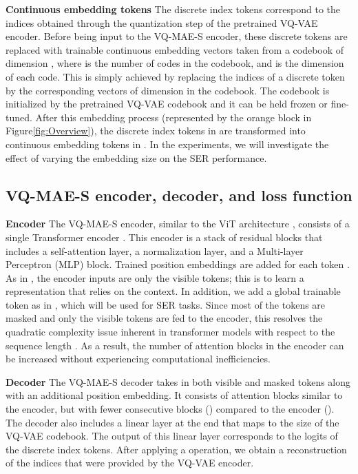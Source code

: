 \documentclass{article}
\newcommand{\myparagraph}[1]{\noindent\textbf{#1}\hspace{.25cm}}
\begin{document}
\myparagraph{Continuous embedding tokens} The discrete index tokens correspond to the indices obtained through the quantization step of the pretrained VQ-VAE encoder. Before being input to the VQ-MAE-S encoder, these discrete tokens are replaced with trainable continuous embedding vectors taken from a codebook of dimension , where  is the number of codes in the codebook, and  is the dimension of each code. This is simply achieved by replacing the  indices of a discrete token by the corresponding  vectors of dimension  in the codebook. The codebook is initialized by the pretrained VQ-VAE codebook and it can be held frozen or fine-tuned. After this embedding process (represented by the orange block in Figure\ref{fig:Overview}), the discrete index tokens in  are transformed into continuous embedding tokens in . In the experiments, we will investigate the effect of varying the embedding size  on the SER performance.

\subsection{VQ-MAE-S encoder, decoder, and loss function}



\myparagraph{Encoder} The VQ-MAE-S encoder, similar to the ViT architecture \cite{dosovitskiy2020image}, consists of a single Transformer encoder \cite{vaswani2017attention}. This encoder is a stack of  residual blocks that includes a self-attention layer, a normalization layer, and a Multi-layer Perceptron (MLP) block. Trained position embeddings are added for each token \cite{devlin2018bert}. As in \cite{he2022masked}, the encoder inputs are only the visible tokens; this is to learn a representation that relies on the context. In addition, we add a global trainable token  as in \cite{devlin2018bert}, which will be used for SER tasks. 
Since most of the tokens are masked and only the visible tokens are fed to the encoder, this resolves the quadratic complexity issue inherent in transformer models with respect to the sequence length \cite{he2022masked}. As a result, the number of attention blocks in the encoder can be increased without experiencing computational inefficiencies.

\myparagraph{Decoder} The VQ-MAE-S decoder takes in both visible and masked tokens along with an additional position embedding. It consists of attention blocks similar to the encoder, but with fewer consecutive blocks () compared to the encoder (). The decoder also includes a linear layer at the end that maps to the size of the VQ-VAE codebook. The output of this linear layer corresponds to the logits of the discrete index tokens. After applying a  operation, we obtain a reconstruction  of the indices  that were provided by the VQ-VAE encoder.
\end{document}
